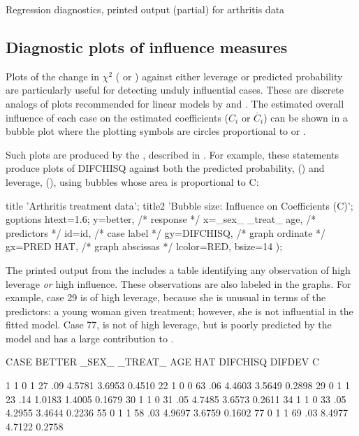 \begin{Output}[htbp]
\caption{Regression diagnostics, printed output (partial) for arthritis data}\label{out:glogist3.1}
\small

\end{Output}

\subsection{Diagnostic plots of influence measures}
Plots of the change in \(\chi^2\) ( or ) against
either leverage or predicted probability are particularly useful
for detecting unduly influential cases.
These are discrete analogs of plots recommended for linear models
by \citet{Fox:91} and \citet{Friendly:91}.
The estimated overall
influence of each case on the estimated coefficients ($C_i$ or $\overline{C}_i$)
can be shown in a bubble plot where the plotting symbols are circles
proportional to  or .

Such plots are produced by the ,
described in .  For example, these
statements produce plots of DIFCHISQ against both the 
predicted probability,  
() and
leverage, 
(),
using bubbles whose area is proportional
to C:
\begin{listing}
title 'Arthritis treatment data';
title2 'Bubble size: Influence on Coefficients (C)';
goptions htext=1.6;
     y=better,               /* response   */
     x=_sex_ _treat_ age,    /* predictors */
     id=id,                  /* case label */
     gy=DIFCHISQ,            /* graph ordinate  */
     gx=PRED HAT,            /* graph abscissas */
     lcolor=RED, bsize=14
     );
\end{listing}

The printed output from the  includes a table
identifying any observation of high leverage \emph{or} high influence.
These observations are also labeled in the graphs.  For
example, case 29 is of high leverage, because she is unusual in terms
of the predictors: a young woman given treatment; however, she is not
influential in the fitted model.  Case 77, is not of high leverage,
but is poorly predicted by the model and has a large contribution to
\chisq.

\begin{output}
CASE BETTER  _SEX_  _TREAT_  AGE   HAT  DIFCHISQ   DIFDEV     C

  1     1      0       1      27   .09    4.5781   3.6953   0.4510
 22     1      0       0      63   .06    4.4603   3.5649   0.2898
 29     0      1       1      23   .14    1.0183   1.4005   0.1679
 30     1      1       0      31   .05    4.7485   3.6573   0.2611
 34     1      1       0      33   .05    4.2955   3.4644   0.2236
 55     0      1       1      58   .03    4.9697   3.6759   0.1602
 77     0      1       1      69   .03    8.4977   4.7122   0.2758
\end{output}

